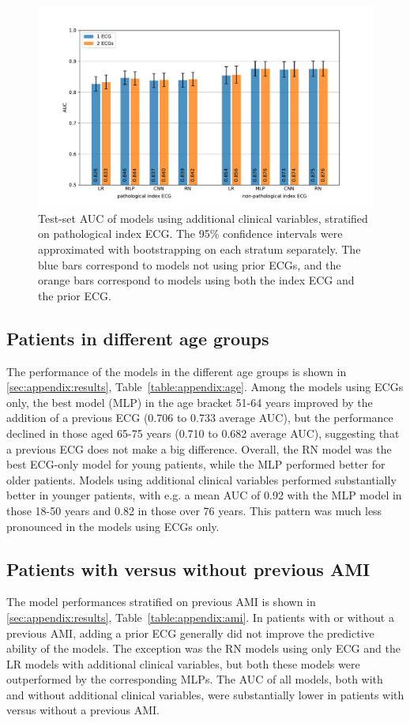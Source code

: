\documentclass[preprint]{elsarticle}
\begin{document}
\begin{figure}[h!]
\includegraphics[width=\linewidth]{figures/path_results.pdf}
\caption{Test-set AUC of models using additional clinical variables, stratified on pathological index ECG. The 95\% confidence intervals were approximated with bootstrapping on each stratum separately. The blue bars correspond to models not using prior ECGs, and the orange bars correspond to models using both the index ECG and the prior ECG.}
\label{fig:pathresults}
\end{figure}

\subsection{Patients in different age groups}
The performance of the models in the different age groups is shown in \ref{sec:appendix:results}, Table~\ref{table:appendix:age}. Among the models using ECGs only, the best model (MLP) in the age bracket 51-64 years improved by the addition of a previous ECG (0.706 to 0.733 average AUC), but the performance declined in those aged 65-75 years (0.710 to 0.682 average AUC), suggesting that a previous ECG does not make a big difference. Overall, the RN model was the best ECG-only model for young patients, while the MLP performed better for older patients. Models using additional clinical variables performed substantially better in younger patients, with e.g. a mean AUC of 0.92 with the MLP model in those 18-50 years and 0.82 in those over 76 years. This pattern was much less pronounced in the models using ECGs only.

\subsection{Patients with versus without previous AMI}
The model performances stratified on previous AMI is shown in \ref{sec:appendix:results}, Table~\ref{table:appendix:ami}. In patients with or without a previous AMI, adding a prior ECG generally did not improve the predictive ability of the models. The exception was the RN models using only ECG and the LR models with additional clinical variables, but both these models were outperformed by the corresponding MLPs. The AUC of all models, both with and without additional clinical variables, were substantially lower in patients with versus without a previous AMI. 
\end{document}
